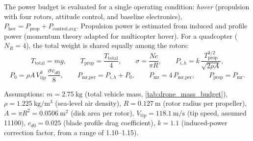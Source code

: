 %

The power budget is evaluated for a single operating condition: \emph{hover}
(propulsion with four rotors, attitude control, and baseline electronics),
$P_{\text{hov}} = P_{\text{prop}} + P_{\text{control,avg}}$. Propulsion
power is estimated from induced and profile power (momentum theory adapted
for multicopter hover). For a quadcopter ($N_R = 4$), the total weight is
shared equally among the rotors:
\[
    T_{\text{total}} = mg, \qquad
    T_{\text{prop}} = \frac{T_{\text{total}}}{4}, \qquad
    \sigma = \frac{Nc}{\pi R}, \qquad
    P_{i,h} = k\,\frac{T_{\text{prop}}^{3/2}}{\sqrt{2\rho A}},
\]
\[
    P_0 = \rho A\, V_{\text{tip}}^3\, \frac{\sigma c_{d0}}{8}, \qquad
    P_{\text{mr,per}} = P_{i,h} + P_0, \qquad
    P_{\text{mr}} = 4\,P_{\text{mr,per}}, \qquad
    P_{\text{prop}} = P_{\text{mr}}.
\]

Assumptions: $m = \qty{2.75}{\kilo\gram}$ (total vehicle mass,
\autoref{tab:drone_mass_budget}), $\rho = \qty{1.225}{\kilo\gram\per\meter\cubed}$
(sea-level air density), $R = \qty{0.127}{\meter}$ (rotor radius per
propeller), $A = \pi R^2 = \qty{0.0506}{\meter\squared}$ (disk area per
rotor), $V_{\text{tip}} = \qty{118.1}{\meter\per\second}$ (tip speed,
assumed \qty{11100}{\rpm}), $c_{d0} = 0.025$ (blade profile drag
coefficient), $k = 1.1$ (induced-power correction factor, from a range of
1.10--1.15).

